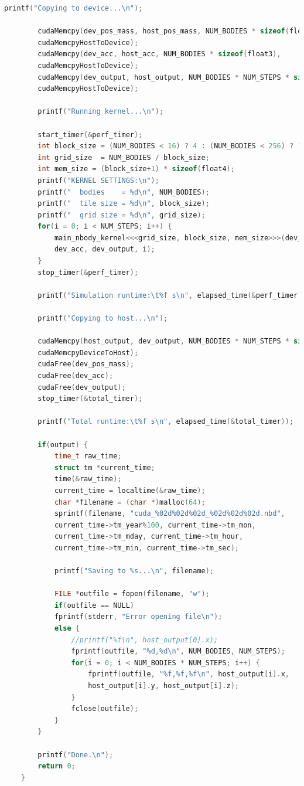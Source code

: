 \documentclass[11pt,a4paper]{article}
\begin{document}
\begin{lstlisting}[language=c]
		printf("Copying to device...\n");
		
		cudaMemcpy(dev_pos_mass, host_pos_mass, NUM_BODIES * sizeof(float3),
		cudaMemcpyHostToDevice);
		cudaMemcpy(dev_acc, host_acc, NUM_BODIES * sizeof(float3),
		cudaMemcpyHostToDevice);
		cudaMemcpy(dev_output, host_output, NUM_BODIES * NUM_STEPS * sizeof(float3),
		cudaMemcpyHostToDevice);
		
		printf("Running kernel...\n");
		
		start_timer(&perf_timer);
		int block_size = (NUM_BODIES < 16) ? 4 : (NUM_BODIES < 256) ? 16 : 32;
		int grid_size  = NUM_BODIES / block_size;
		int mem_size = (block_size+1) * sizeof(float4);
		printf("KERNEL SETTINGS:\n");
		printf("  bodies    = %d\n", NUM_BODIES);
		printf("  tile size = %d\n", block_size);
		printf("  grid size = %d\n", grid_size);
		for(i = 0; i < NUM_STEPS; i++) {
			main_nbody_kernel<<<grid_size, block_size, mem_size>>>(dev_pos_mass,
			dev_acc, dev_output, i);
		}
		stop_timer(&perf_timer);
		
		printf("Simulation runtime:\t%f s\n", elapsed_time(&perf_timer));
		
		printf("Copying to host...\n");
		
		cudaMemcpy(host_output, dev_output, NUM_BODIES * NUM_STEPS * sizeof(float3),
		cudaMemcpyDeviceToHost);
		cudaFree(dev_pos_mass);
		cudaFree(dev_acc);
		cudaFree(dev_output);
		stop_timer(&total_timer);
		
		printf("Total runtime:\t%f s\n", elapsed_time(&total_timer));
		
		if(output) {
			time_t raw_time;
			struct tm *current_time;
			time(&raw_time);
			current_time = localtime(&raw_time);
			char *filename = (char *)malloc(64);
			sprintf(filename, "cuda_%02d%02d%02d_%02d%02d%02d.nbd", 
			current_time->tm_year%100, current_time->tm_mon,
			current_time->tm_mday, current_time->tm_hour,
			current_time->tm_min, current_time->tm_sec);
			
			printf("Saving to %s...\n", filename);
			
			FILE *outfile = fopen(filename, "w");
			if(outfile == NULL)
			fprintf(stderr, "Error opening file\n");
			else {
				//printf("%f\n", host_output[0].x);
				fprintf(outfile, "%d,%d\n", NUM_BODIES, NUM_STEPS);
				for(i = 0; i < NUM_BODIES * NUM_STEPS; i++) {
					fprintf(outfile, "%f,%f,%f\n", host_output[i].x, 
					host_output[i].y, host_output[i].z);
				}
				fclose(outfile);
			}
		}
		
		printf("Done.\n");
		return 0;
	}
	

\end{lstlisting}
\end{document}
